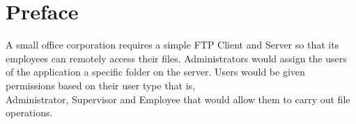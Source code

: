 \section*{Preface}
A small office corporation requires a simple FTP Client and Server so that its employees can remotely access their files. Administrators would assign the users of the application a specific folder on the server. Users would be given permissions based on their user type that is,\\ Administrator, Supervisor and Employee that would allow them to carry out file operations.
